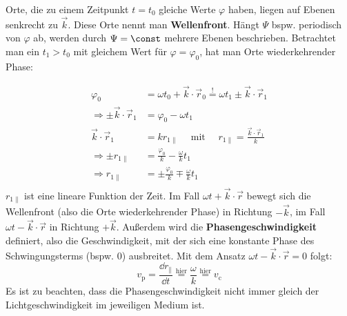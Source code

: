 	 Orte, die zu einem Zeitpunkt \(t=t_0\) gleiche Werte \(\varphi\) haben, liegen auf Ebenen senkrecht zu \(\vec{k}\).  Diese Orte nennt man \textbf{Wellenfront}. Hängt $\Psi$ bspw. periodisch von $\varphi$ ab, werden durch $\Psi=\const$ mehrere Ebenen beschrieben. Betrachtet man ein \(t_1 > t_0\) mit gleichem Wert für $\varphi=\varphi_0$, hat man Orte wiederkehrender Phase:
	   \begin{center}
	 	\resizebox{.5\textwidth}{!}{}
	 \end{center}
		        \begin{equation}\begin{split}
				        \varphi_0 &= \omega t_0 + \vec{k}\cdot\vec{r} _0 \stackrel{!}{=} \omega t_1 \pm \vec{k}\cdot\vec{r} _1\\
				        \Rightarrow \pm \vec{k}\cdot\vec{r} _1 &= \varphi_0 - \omega t_1  \\   \vec{k}\cdot\vec{r} _1 &= k r_{1\parallel}\quad \text{ mit } \quad r_{1\parallel}=\frac{\vec{k}\cdot\vec{r} _1}{ k}  \\
				        \Rightarrow \pm r_{1\parallel} &=\frac{\varphi_0}{ k} - \frac{\omega}{k} t_1\\
				        \Rightarrow r_{1\parallel} &= \pm\frac{\varphi_0}{ k} \mp \frac{\omega}{k} t_1\\
			        \end{split}\end{equation}
		  $r_{1\parallel} $ ist eine lineare Funktion der Zeit. Im Fall \(\omega t {+} \vec{k}\cdot\vec{r} \) bewegt sich die Wellenfront (also die Orte wiederkehrender Phase) in Richtung \(-\vec{k}\), im Fall \(\omega t {-} \vec{k}\cdot\vec{r} \) in Richtung $+\vec{k}$. Außerdem wird die
		   \textbf{Phasengeschwindigkeit} definiert, also die Geschwindigkeit, mit der sich  eine konstante Phase des Schwingungsterms (bspw. 0) ausbreitet. Mit dem Ansatz \(\omega t {-} \vec{k}\cdot\vec{r} =0\) folgt:
		   \begin{equation}
		   	\boxed{ v_\mathrm{p} =\frac{\dd r_{\parallel}}{\dd t} }\stackrel{\text{hier}}{=} \frac{\omega}{ k} \stackrel{\text{hier}}{=}{ v_\mathrm{c}}
		   \end{equation}
	Es ist zu beachten, dass die Phasengeschwindigkeit nicht immer gleich der Lichtgeschwindigkeit im jeweiligen Medium ist. 
